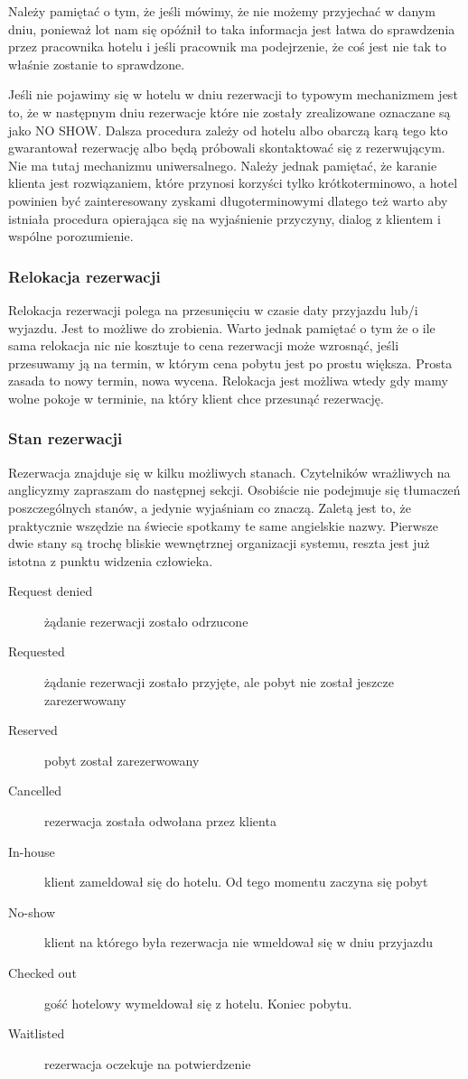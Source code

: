 \documentclass[a4paper,onecolumn,oneside,11pt,wide,floatssmall]{mwrep}
\theoremstyle{definition}
\theoremstyle{plain}%
\theoremstyle{remark}
\begin{document}
  Należy pamiętać o tym, że jeśli mówimy, że nie możemy przyjechać w danym dniu,
  ponieważ lot nam się opóźnił to taka informacja jest łatwa do sprawdzenia
  przez pracownika hotelu i jeśli pracownik ma podejrzenie, że coś jest nie tak
  to właśnie zostanie to sprawdzone.

Jeśli nie pojawimy się w hotelu w dniu rezerwacji to typowym mechanizmem jest
to, że w następnym dniu rezerwacje które nie zostały zrealizowane oznaczane są
jako NO SHOW. Dalsza procedura zależy od hotelu albo obarczą karą tego kto
gwarantował rezerwację albo będą próbowali skontaktować się z rezerwującym. Nie
ma tutaj mechanizmu uniwersalnego. Należy jednak pamiętać, że karanie klienta
jest rozwiązaniem, które przynosi korzyści tylko krótkoterminowo, a hotel
powinien być zainteresowany zyskami długoterminowymi dlatego też warto aby
istniała procedura opierająca się na wyjaśnienie przyczyny, dialog z klientem i
wspólne porozumienie.

\subsubsection{Relokacja rezerwacji}
Relokacja rezerwacji polega na przesunięciu w czasie daty 
przyjazdu lub/i wyjazdu. Jest to możliwe do zrobienia. Warto jednak pamiętać o
tym że o ile sama relokacja nic nie kosztuje to cena rezerwacji może 
wzrosnąć, jeśli przesuwamy ją na termin, w którym cena pobytu jest po prostu 
większa. Prosta zasada to nowy termin, nowa wycena. Relokacja jest możliwa 
wtedy gdy mamy wolne pokoje w terminie, na który klient chce przesunąć
rezerwację.

\subsubsection{Stan rezerwacji}
Rezerwacja znajduje się w kilku możliwych stanach. Czytelników wrażliwych na
anglicyzmy zapraszam do następnej sekcji. Osobiście nie podejmuje się tłumaczeń
poszczególnych stanów, a jedynie wyjaśniam co znaczą. Zaletą jest to, że
praktycznie wszędzie na świecie spotkamy te same angielskie nazwy. Pierwsze dwie
stany są trochę bliskie wewnętrznej organizacji systemu, reszta jest już istotna
z punktu widzenia człowieka.

\begin{description}
\item[Request denied] żądanie rezerwacji zostało odrzucone
\item[Requested] żądanie rezerwacji zostało przyjęte, ale pobyt nie został
jeszcze zarezerwowany
\item[Reserved] pobyt został zarezerwowany
\item[Cancelled] rezerwacja została odwołana przez klienta
\item[In-house] klient zameldował się do hotelu. Od tego momentu zaczyna się
pobyt
\item[No-show] klient na którego była rezerwacja nie wmeldował się w dniu
przyjazdu
\item[Checked out] gość hotelowy wymeldował się z hotelu. Koniec pobytu.
\item[Waitlisted] rezerwacja oczekuje na potwierdzenie
\end{description}
\end{document}
